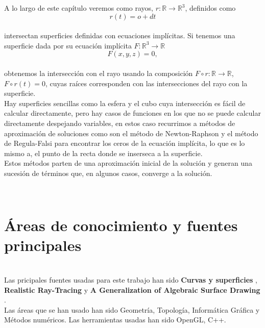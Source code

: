 A lo largo de este capítulo veremos como rayos, $ r : \mathbb{R} \to \mathbb{R}^3$, definidos como
${ }$\\
$$ r(t) = o + dt $$
${ }$\\
intersectan superficies definidas con ecuaciones implícitas. Si tenemos una superficie dada por su ecuación implícita $ F : \mathbb{R}^3 \to \mathbb{R} $
${ }$\\
$$ F(x,y,z) = 0, $$
${ }$\\
obtenemos la intersección con el rayo usando la composición $F \circ r : \mathbb{R} \to \mathbb{R}$, $F \circ r (t) = 0$, cuyas raíces corresponden con las intersecciones del rayo con la superficie.
${ }$\\

Hay superficies sencillas como la esfera y el cubo cuya intersección es fácil de calcular directamente, pero hay casos de funciones en los que no se puede calcular directamente despejando variables, en estos caso recurrimos a métodos de aproximación de soluciones como son el método de Newton-Raphson y el método de Regula-Falsi para encontrar los ceros de la ecuación implícita, lo que es lo mismo a, el punto de la recta donde se inserseca a la superficie.
${ }$\\

Estos métodos parten de una aproximación inicial de la solución y generan una sucesión de términos que, en algunos casos, converge a la solución.

${ }$\\
\section{Áreas de conocimiento y fuentes principales}
${ }$\\

Las pricipales fuentes usadas para este trabajo han sido \textbf{Curvas y superficies} \cite{MonRos}, \textbf{Realistic Ray-Tracing} \cite{Shirley} y \textbf{A Generalization of Algebraic Surface Drawing} \cite{Blinn}.
${ }$\\

Las áreas que se han usado han sido Geometría, Topología, Informática Gráfica y Métodos numéricos. Las herramientas usadas han sido OpenGL, C++.
${ }$\\
